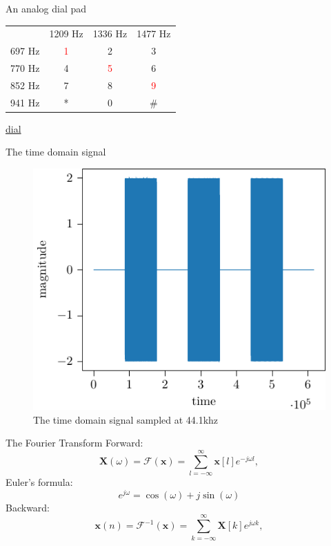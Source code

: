\documentclass[xcolor=dvipsnames]{beamer}
\begin{document}
\begin{frame}{An analog dial pad}
\centering
\begin{tabular}{c c c c}
      & 1209 Hz & 1336 Hz & 1477 Hz \\
697 Hz   & \textcolor{red}{1}    & 2       & 3    \\  
770 Hz   & 4    & \textcolor{red}{5}       & 6    \\
852 Hz   & 7    & 8       & \textcolor{red}{9}    \\
941 Hz   & *    & 0       & \#     \\
\end{tabular}

\begin{center}
\href{run:./phone_seq.wav}{dial}
\end{center}
\end{frame}


\begin{frame}{The time domain signal}
\centering
\begin{figure}
\includegraphics[width=.6\linewidth]{plots/seq_plot.pdf}
\caption{The time domain signal sampled at 44.1khz}
\end{figure}
\end{frame}

\begin{frame}{The Fourier Transform}
Forward:
\begin{equation}
   \mathbf{X}(\omega) = \mathcal{F}\left(\mathbf{x}\right) = \sum_{l = -\infty}^{\infty} \mathbf{x}[l]e^{-j\omega l},
    \label{eq:STFT}
\end{equation}
Euler's formula:
\begin{equation}
e^{j\omega} = \cos(\omega) + j\sin (\omega)
\end{equation}
Backward:
\begin{equation}
   \mathbf{x}(n) = \mathcal{F}^{-1}\left(\mathbf{x}\right) = \sum_{k = -\infty}^{\infty} \mathbf{X}[k]e^{j\omega k},
    \label{eq:STFT}
\end{equation}
\end{frame}
\end{document}
